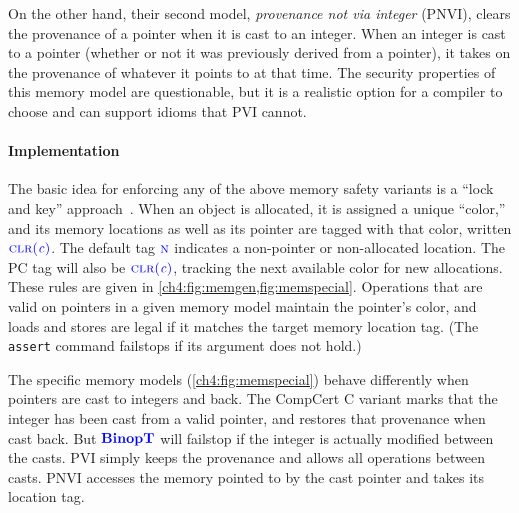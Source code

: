 On the other hand, their second model, {\em provenance not via integer} (PNVI), clears the
provenance of a pointer when it is cast to an integer. When an integer is cast to a pointer
(whether or not it was previously derived from a pointer), it takes on the provenance of whatever
it points to at that time. The security properties of this memory model are questionable, but
it is a realistic option for a compiler to choose and can support idioms that PVI cannot.

\paragraph*{Implementation}

The basic idea for enforcing any of the above memory safety variants is a ``lock and key'' approach~\cite{Clause07:MemsafeTainting,Azevedo+15}.
When an object is allocated, it is assigned a unique ``color,'' and its memory locations as well
as its pointer are tagged with that color, written \(\textnormal{\color{blue} \sc clr}{\color{blue}(\mathit{c})}\).
The default tag \(\textnormal{\color{blue} \sc n}\) indicates a non-pointer or non-allocated location.
The PC tag will also be \(\textnormal{\color{blue} \sc clr}{\color{blue}(\mathit{c})}\),
tracking the next available color for new allocations. These rules are given in \cref{ch4:fig:memgen,fig:memspecial}. Operations that are valid on pointers in a given memory model
maintain the pointer's color, and loads and stores are legal if it matches
the target memory location tag. (The {\tt assert} command failstops if its argument does not hold.)

The specific memory models (\cref{ch4:fig:memspecial}) behave differently when pointers are cast to
integers and back.
The CompCert C variant marks that the integer has been cast from a valid pointer, and
restores that provenance when cast back. But \(\color{blue} \mathbf{BinopT}\) will failstop if the integer is
actually modified between the casts. PVI simply keeps the provenance and allows all operations
between casts. PNVI accesses the memory pointed to by the cast pointer and takes its
location tag.

